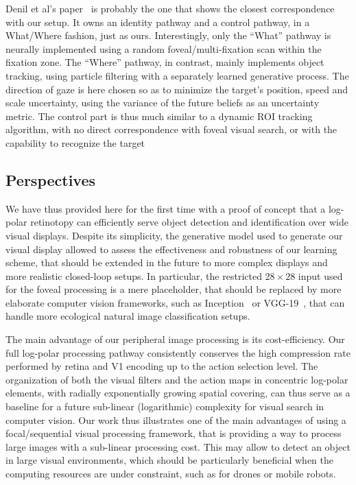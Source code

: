 Denil et al's paper~\cite{denil2012learning} is probably the one that shows the closest correspondence with our setup. It owns an identity pathway and a control pathway, in a What/Where fashion, just as ours. Interestingly, only the ``What'' pathway is neurally implemented using a random foveal/multi-fixation scan within the fixation zone. The ``Where'' pathway, in contrast, mainly implements object tracking, using particle filtering with a separately learned generative process. The direction of gaze is here chosen so as to minimize the target's position, speed and scale uncertainty, using the variance of the future beliefs as an uncertainty metric. The control part is thus much similar to a dynamic ROI tracking algorithm, with no direct correspondence with foveal visual search, or with the capability to recognize the target
%
\subsection{Perspectives}
%
We have thus provided here for the first time with a proof of concept that a log-polar retinotopy can efficiently serve object detection and identification over wide visual displays. Despite its simplicity, the generative model used to generate our visual display allowed to assess the effectiveness and robustness of our learning scheme, that should be extended in the future to more complex displays and more realistic closed-loop setups. In particular, the restricted $28\times28$ input used for the foveal processing is a mere placeholder, that should be replaced by more elaborate computer vision frameworks, such as Inception~\cite{szegedy2015going} or VGG-19~\cite{simonyan2014very}, that can handle more ecological natural image classification setups.

The main advantage of our peripheral image processing is its cost-efficiency. Our full log-polar processing pathway consistently conserves the high compression rate performed by retina and V1 encoding up to the action selection level. The organization of both the visual filters and the action maps in concentric log-polar elements, with radially exponentially growing spatial covering, can thus serve as a baseline for a future sub-linear (logarithmic) complexity for visual search in computer vision. Our work thus illustrates one of the main advantages of using a focal/sequential visual processing framework, that is providing a way to process large images with a sub-linear processing cost. This may allow to detect an object in large visual environments, which should be particularly beneficial when the computing resources are under constraint, such as for drones or mobile robots.

